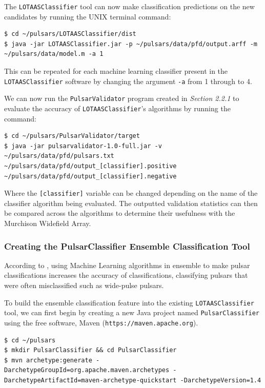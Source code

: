 \documentclass{article}
\begin{document}
The \verb|LOTAASClassifier| tool can now make classification predictions on the new candidates by running the UNIX terminal command:

\begin{lstlisting}[numbers=none]
$ cd ~/pulsars/LOTAASClassifier/dist
$ java -jar LOTAASClassifier.jar -p ~/pulsars/data/pfd/output.arff -m ~/pulsars/data/model.m -a 1
\end{lstlisting}

This can be repeated for each machine learning classifier present in the \verb|LOTAASClassifier| software by changing the argument \verb|-a| from 1 through to 4.

We can now run the \verb|PulsarValidator| program created in \emph{Section 2.2.1} to evaluate the accuracy of \verb|LOTAASClassifier|'s algorithms by running the command:

\begin{lstlisting}[numbers=none]
$ cd ~/pulsars/PulsarValidator/target
$ java -jar pulsarvalidator-1.0-full.jar -v ~/pulsars/data/pfd/pulsars.txt ~/pulsars/data/pfd/output_[classifier].positive ~/pulsars/data/pfd/output_[classifier].negative
\end{lstlisting}

Where the \verb|[classifier]| variable can be changed depending on the name of the classifier algorithm being evaluated. The outputted validation statistics can then be compared across the algorithms to determine their usefulness with the Murchison Widefield Array.

\subsubsection{Creating the PulsarClassifier Ensemble Classification Tool}
\label{sec:methodensemble}
According to \cite{tan}, using Machine Learning algorithms in ensemble to make pulsar classifications increases the accuracy of classifications, classifying pulsars that were often misclassified such as wide-pulse pulsars.

To build the ensemble classification feature into the existing \verb|LOTAASClassifier| tool, we can first begin by creating a new Java project named \verb|PulsarClassifier| using the free software, Maven (\verb|https://maven.apache.org|).

\begin{lstlisting}[numbers=none]
$ cd ~/pulsars
$ mkdir PulsarClassifier && cd PulsarClassifier
$ mvn archetype:generate -DarchetypeGroupId=org.apache.maven.archetypes -DarchetypeArtifactId=maven-archetype-quickstart -DarchetypeVersion=1.4
\end{lstlisting}
\end{document}

